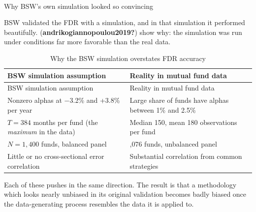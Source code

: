 \documentclass[
  letterpaper,
  DIV=11,
  numbers=noendperiod]{scrartcl}
\makeatletter
\let\oldparagraph\paragraph
\renewcommand{\paragraph}{
    \@ifstar
      \xxxParagraphStar
      \xxxParagraphNoStar
  }
\newcommand{\xxxParagraphStar}[1]{\oldparagraph*{#1}\mbox{}}
\newcommand{\xxxParagraphNoStar}[1]{\oldparagraph{#1}\mbox{}}
\makeatother
\begin{document}
\paragraph{Why BSW's own simulation looked so
convincing}\label{why-bsws-own-simulation-looked-so-convincing}

BSW validated the FDR with a simulation, and in that simulation it
performed beautifully. (\textbf{andrikogiannopoulou2019?}) show why: the
simulation was run under conditions far more favorable than the real
data.

\begin{longtable}[]{@{}
  >{\raggedright\arraybackslash}p{}
  >{\raggedright\arraybackslash}p{}@{}}
\caption{Why the BSW simulation overstates FDR accuracy}\tabularnewline
\toprule\noalign{}
\begin{minipage}[b]{\linewidth}\raggedright
BSW simulation assumption
\end{minipage} & \begin{minipage}[b]{\linewidth}\raggedright
Reality in mutual fund data
\end{minipage} \\
\midrule\noalign{}
\endfirsthead
\toprule\noalign{}
\begin{minipage}[b]{\linewidth}\raggedright
BSW simulation assumption
\end{minipage} & \begin{minipage}[b]{\linewidth}\raggedright
Reality in mutual fund data
\end{minipage} \\
\midrule\noalign{}
\endhead
\bottomrule\noalign{}
\endlastfoot
Nonzero alphas at −3.2\% and +3.8\% per year & Large share of funds have
alphas between 1\% and 2.5\% \\
\(T = 384\) months per fund (the \emph{maximum} in the data) & Median
150, mean 180 observations per fund \\
\(N = 1{,}400\) funds, balanced panel & 2,076 funds, unbalanced panel \\
Little or no cross-sectional error correlation & Substantial correlation
from common strategies \\
\end{longtable}

Each of these pushes in the same direction. The result is that a
methodology which looks nearly unbiased in its original validation
becomes badly biased once the data-generating process resembles the data
it is applied to.
\end{document}
